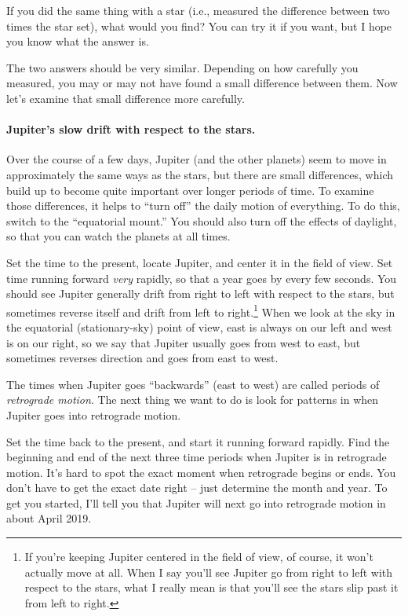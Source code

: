 \vskip 1.5in

If you did the same thing with a star (i.e., measured the difference between
two times  the star set), what would you find? You can try it if you want,
but I hope you know what the answer is.

\vskip 1in

The two answers should be very similar. Depending on how carefully you 
measured, you may or may not have found a small difference between them.
Now let's examine that small difference more carefully.

\paragraph{Jupiter's slow drift with respect to the stars.}
Over the course of a few days, Jupiter (and the other planets) seem to
move in approximately the same ways as the stars, but there are 
small differences, which build up to become quite important
over longer periods of time. To examine those differences,
it helps to ``turn off'' the daily motion of everything.
To do this, switch to the ``equatorial mount.''
You should also turn off the effects of daylight,
so that you can watch the planets at all times.


Set the time to the present, locate Jupiter, and center it in the field
of view. Set time running forward \textit{very} rapidly, so that a year goes by
every few seconds. You should see Jupiter generally drift from right
to left with respect to the stars, but sometimes reverse itself
and drift from left to right.\footnote{If you're keeping Jupiter 
centered in the field of view, of course, it won't actually move at all.
When I say you'll see Jupiter go from right to left
with respect to the stars, what I really mean
is that you'll see the stars slip past it from left to right.}
When we look at the sky in the equatorial (stationary-sky) point of view, 
east is always on
our left and west is on our right, so we say that Jupiter
usually goes from west to east, but sometimes reverses direction and
goes from east to west.

The times when Jupiter goes ``backwards'' (east to west) are called
periods of \textit{retrograde motion}. The next thing we want to 
do is look for patterns in when Jupiter goes into retrograde motion.

Set the time back to the present, and start it running forward
rapidly. Find the beginning and end of the next three time periods
when Jupiter is in retrograde motion. It's hard to spot the
exact moment when retrograde begins or ends. You don't
have to get the exact date right -- just determine the month and
year. To get you started, I'll tell you that Jupiter will
next go into retrograde motion in about April 2019.


